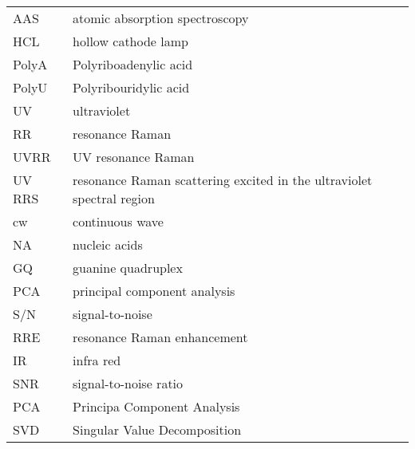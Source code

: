 

\noindent
\begin{tabularx}{\textwidth}{@{}l@{\,\dotfill\dots\,}X@{}}
AAS
	& atomic absorption spectroscopy\\
HCL
	& hollow cathode lamp\\
PolyA
	& Polyriboadenylic acid\\
PolyU
	& Polyribouridylic acid\\
UV
	& ultraviolet\\
RR
	& resonance Raman\\
UVRR
	& UV resonance Raman\\
UV RRS
	& resonance Raman scattering excited in the ultraviolet spectral region\\
cw
	& continuous wave\\
NA
	& nucleic acids\\
GQ
	& guanine quadruplex\\
PCA
	& principal component analysis\\
S/N
	& signal-to-noise\\
RRE
	& resonance Raman enhancement\\
IR
	& infra red\\
SNR
	& signal-to-noise ratio\\
PCA
	& Principa Component Analysis\\
SVD
	& Singular Value Decomposition
\end{tabularx}
